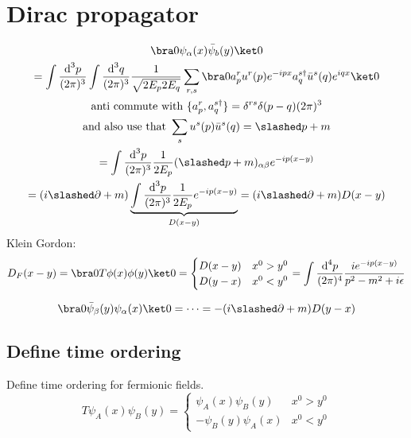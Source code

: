 \documentclass[]{scrartcl}
\begin{document}
\section{Dirac propagator}

\begin{gather}
	\bra 0 \psi_\alpha(x) \bar\psi_b(y) \ket 0\\
	= \int \frac{\text d^3p}{(2\pi)^3}\int\frac{\text d^3q}{(2\pi)^3}\frac{1}{\sqrt{2E_p 2E_q}}\sum_{r,s}\bra0 a_p^r u^r(p) e^{-ipx} a_q^{s\dagger}\bar u^s(q)e^{iqx}\ket 0\\
	\text{anti commute with } \{a_p^r, a_q^{s\dagger}\} = \delta^{rs}\delta(p-q)(2\pi)^3 \nonumber\\
	\text{and also use that } \sum_s u^s(p)\bar u^s(q) = \slashed p + m \nonumber\\
	= \int\frac{\text d^3p}{(2\pi)^3}\frac{1}{2E_p}(\slashed p + m)_{\alpha\beta}e^{-ip(x-y)}\\
	= (i\slashed\partial + m) \underbrace{\int\frac{\text d^3p}{(2\pi)^3}\frac{1}{2E_p}e^{-ip(x-y)}}_{D(x-y)} = (i\slashed\partial + m)D(x-y)
\end{gather}
Klein Gordon:
\begin{equation}
	D_F(x-y) = \bra0 T\phi(x)\phi(y) \ket0 =
	\begin{cases}
		D(x-y) & x^0 > y^0\\
		D(y-x) & x^0 < y^0
	\end{cases}
	= \int\frac{\text d^4p}{(2\pi)^4}\frac{ie^{-ip(x-y)}}{p^2 - m^2 + i\epsilon}
\end{equation}

\begin{equation}
	\bra 0 \bar\psi_\beta(y) \psi_\alpha(x)\ket 0 = \cdots = -(i\slashed\partial + m) D(y-x)
\end{equation}
\subsection{Define time ordering}
Define time ordering for fermionic fields.
\begin{equation}
	T\psi_A(x)\psi_B(y) =
	\begin{cases}
		\psi_A(x)\psi_B(y) & x^0 > y^0\\
		-\psi_B(y)\psi_A(x) & x^0 < y^0
	\end{cases}
\end{equation}
\end{document}
